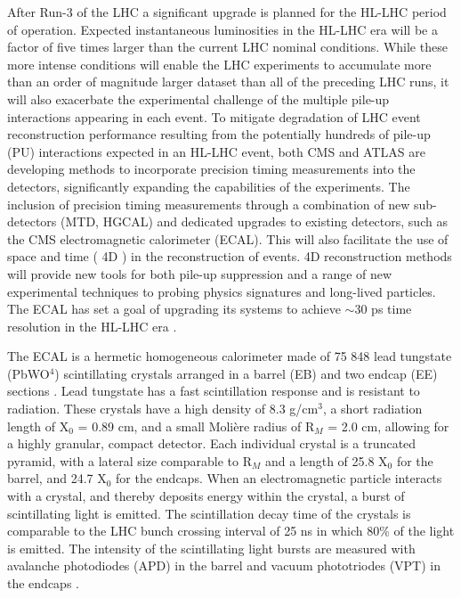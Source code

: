 After Run-3 of the LHC a significant upgrade is planned for the HL-LHC \cite{Apollinari:2015wtw} period of operation. Expected instantaneous luminosities in the HL-LHC era will be a factor of five times larger than the current LHC nominal conditions. While these more intense conditions will enable the LHC experiments to accumulate more than an order of magnitude larger dataset than all of the preceding LHC runs, it will also exacerbate the experimental challenge of the multiple pile-up interactions appearing in each event. To mitigate degradation of LHC event reconstruction performance resulting from the potentially hundreds of pile-up (PU) interactions expected in an HL-LHC event, both CMS \cite{Butler:2019rpu} and ATLAS \cite{Morgenstern:2019xto} are developing methods to incorporate precision timing measurements into the detectors, significantly expanding the capabilities of the experiments. The inclusion of precision timing measurements through a combination of new sub-detectors (MTD, HGCAL) and dedicated upgrades to existing detectors, such as the CMS electromagnetic calorimeter (ECAL). This will also facilitate the use of space and time ( 4D ) in the reconstruction of events. 4D reconstruction methods will provide new tools for both pile-up suppression and a range of new experimental techniques to probing physics signatures and long-lived particles. The ECAL has set a goal of upgrading its systems to achieve $\sim$30 ps time resolution in the HL-LHC era \cite{Bruneliere:2006ra}.

The ECAL is a hermetic homogeneous calorimeter made of 75 848 lead tungstate (PbWO$^{4}$) scintillating crystals arranged in a barrel (EB) and two endcap (EE) sections \cite{cmstdr}.  Lead tungstate has a fast scintillation response and is resistant to radiation.  These crystals have a high density of 8.3 g/cm$^{3}$, a short radiation length of X$_{0}$ = 0.89 cm, and a small Moli\`ere radius of R$_{M}$ = 2.0 cm, allowing for a highly granular, compact detector. Each individual crystal is a truncated pyramid, with a lateral size comparable to R$_{M}$ and a length of 25.8 X$_{0}$ for the barrel, and 24.7 X$_{0}$ for the endcaps. When an electromagnetic particle interacts with a crystal, and thereby deposits energy within the crystal, a burst of scintillating light is emitted. The scintillation decay time of the crystals is comparable to the LHC bunch crossing interval of 25 ns in which 80\% of the light is emitted. The intensity of the scintillating light bursts are measured with avalanche photodiodes (APD) in the barrel and vacuum phototriodes (VPT) in the endcaps \cite{Bayatian:2006nff}.

